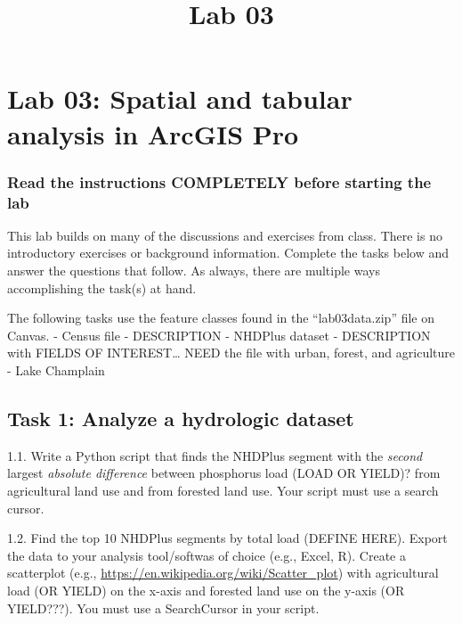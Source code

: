 \documentclass[]{article}
\title{Lab 03}
\author{}
\date{}
\makeatletter
\renewcommand{\maketitle}{\bgroup\vspace*{-1cm}\setlength{\parindent}{0pt}
\begin{flushleft}
  \@author
  
  \@date
  
\end{flushleft}\egroup
}
\makeatother
\begin{document}
\maketitle

\hypertarget{lab-03-spatial-and-tabular-analysis-in-arcgis-pro}{%
\section{Lab 03: Spatial and tabular analysis in ArcGIS
Pro}\label{lab-03-spatial-and-tabular-analysis-in-arcgis-pro}}

\hypertarget{read-the-instructions-completely-before-starting-the-lab}{%
\subsubsection{Read the instructions COMPLETELY before starting the
lab}\label{read-the-instructions-completely-before-starting-the-lab}}

This lab builds on many of the discussions and exercises from class.
There is no introductory exercises or background information. Complete
the tasks below and answer the questions that follow. As always, there
are multiple ways accomplishing the task(s) at hand.

The following tasks use the feature classes found in the
``lab03data.zip'' file on Canvas. - Census file - DESCRIPTION - NHDPlus
dataset - DESCRIPTION with FIELDS OF INTEREST\ldots{} NEED the file with
urban, forest, and agriculture - Lake Champlain

\hypertarget{task-1-analyze-a-hydrologic-dataset}{%
\subsection{Task 1: Analyze a hydrologic
dataset}\label{task-1-analyze-a-hydrologic-dataset}}

1.1. Write a Python script that finds the NHDPlus segment with the
\emph{second} largest \emph{absolute difference} between phosphorus load
(LOAD OR YIELD)? from agricultural land use and from forested land use.
Your script must use a search cursor.

1.2. Find the top 10 NHDPlus segments by total load (DEFINE HERE).
Export the data to your analysis tool/softwas of choice (e.g., Excel,
R). Create a scatterplot (e.g.,
\url{https://en.wikipedia.org/wiki/Scatter_plot}) with agricultural load
(OR YIELD) on the x-axis and forested land use on the y-axis (OR
YIELD???). You must use a SearchCursor in your script.
\end{document}

